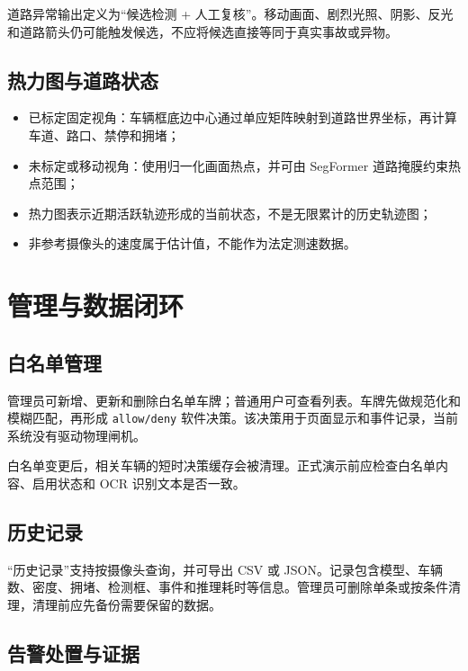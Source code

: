 道路异常输出定义为``候选检测 + 人工复核''。移动画面、剧烈光照、阴影、反光和道路箭头仍可能触发候选，不应将候选直接等同于真实事故或异物。

\subsection{热力图与道路状态}\label{manual-ux70edux529bux56feux4e0eux9053ux8defux72b6ux6001}

\begin{itemize}
\tightlist
\item
  已标定固定视角：车辆框底边中心通过单应矩阵映射到道路世界坐标，再计算车道、路口、禁停和拥堵；
\item
  未标定或移动视角：使用归一化画面热点，并可由 SegFormer 道路掩膜约束热点范围；
\item
  热力图表示近期活跃轨迹形成的当前状态，不是无限累计的历史轨迹图；
\item
  非参考摄像头的速度属于估计值，不能作为法定测速数据。
\end{itemize}

\section{管理与数据闭环}\label{manual-ux7ba1ux7406ux4e0eux6570ux636eux95edux73af}

\subsection{白名单管理}\label{manual-ux767dux540dux5355ux7ba1ux7406}

管理员可新增、更新和删除白名单车牌；普通用户可查看列表。车牌先做规范化和模糊匹配，再形成 \texttt{allow/\allowbreak{}deny} 软件决策。该决策用于页面显示和事件记录，当前系统没有驱动物理闸机。

白名单变更后，相关车辆的短时决策缓存会被清理。正式演示前应检查白名单内容、启用状态和 OCR 识别文本是否一致。

\subsection{历史记录}\label{manual-ux5386ux53f2ux8bb0ux5f55}

``历史记录''支持按摄像头查询，并可导出 CSV 或 JSON。记录包含模型、车辆数、密度、拥堵、检测框、事件和推理耗时等信息。管理员可删除单条或按条件清理，清理前应先备份需要保留的数据。

\subsection{告警处置与证据}\label{manual-ux544aux8b66ux5904ux7f6eux4e0eux8bc1ux636e}

